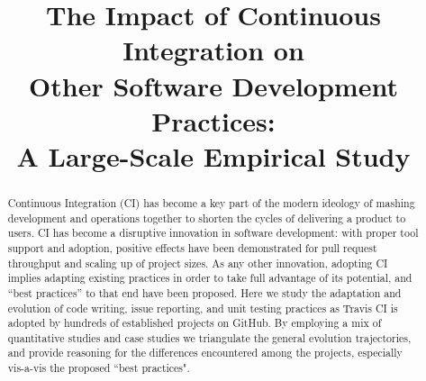 \documentclass[10pt,conference]{IEEEtran}
\newcommand{\GH}{{\sc GitHub}\xspace}
\newcommand{\Tvis}{{\sc Travis CI}\xspace}
\newcommand\blfootnote[1]{%
  \begingroup
  \renewcommand\thefootnote{}\footnote{#1}%
  \addtocounter{footnote}{-1}%
  \endgroup
}
\begin{document}
\title{The Impact of Continuous Integration on \\Other Software 
Development Practices: \\A Large-Scale Empirical Study}


\maketitle
\begin{abstract}
Continuous Integration (CI)
has become a key part of the modern ideology 
of mashing development and operations together to shorten the cycles of 
delivering a product to users. 
CI has become a disruptive innovation in software development: with proper 
tool support and adoption, positive effects have been demonstrated for pull 
request throughput and scaling up of project sizes. 
As any other innovation, adopting CI implies adapting existing practices in 
order to take full advantage of its potential, and ``best practices'' to that end 
have been proposed. 
Here we study the adaptation and evolution of code writing, issue reporting, 
and unit testing practices as \Tvis is adopted by hundreds of established 
projects on \GH. 
By employing a mix of quantitative studies and case studies we triangulate 
the general evolution trajectories, and provide reasoning for the differences 
encountered among the projects, especially vis-a-vis the proposed ``best 
practices".
\end{abstract}














\balance

\newpage


\end{document}
